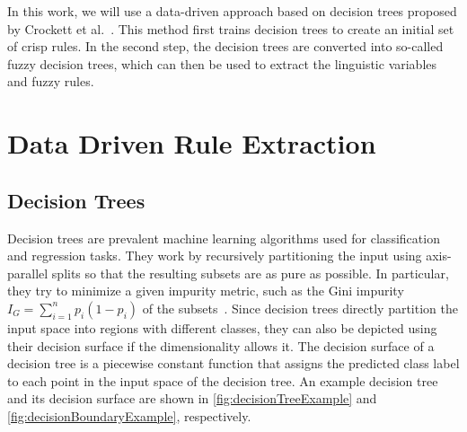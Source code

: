 In this work, we will use a data-driven approach based on decision trees proposed by Crockett et al.~\cite{CROCKETT20062809}. This method first trains decision trees to create an initial set of crisp rules. In the second step, the decision trees are converted into so-called fuzzy decision trees, which can then be used to extract the linguistic variables and fuzzy rules.

\section{Data Driven Rule Extraction}

\subsection{Decision Trees}

Decision trees are prevalent machine learning algorithms used for classification and regression tasks. They work by recursively partitioning the input using axis-parallel splits so that the resulting subsets are as pure as possible. In particular, they try to minimize a given impurity metric, such as the Gini impurity $I_G = \sum_{i=1}^{n} p_i(1-p_i)$ of the subsets~\cite{10.5555/2380985}. Since decision trees directly partition the input space into regions with different classes, they can also be depicted using their decision surface if the dimensionality allows it. The decision surface of a decision tree is a piecewise constant function that assigns the predicted class label to each point in the input space of the decision tree. An example decision tree and its decision surface are shown in \autoref{fig:decisionTreeExample} and \autoref{fig:decisionBoundaryExample}, respectively.

